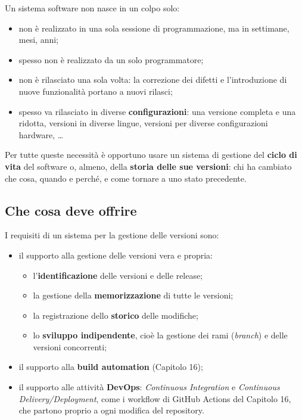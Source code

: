 Un sistema software non nasce in un colpo solo:

\begin{itemize}
  \item non è realizzato in una sola sessione di programmazione, ma in settimane, mesi, anni;
  \item spesso non è realizzato da un solo programmatore;
  \item non è rilasciato una sola volta: la correzione dei difetti e l'introduzione di nuove funzionalità portano a
        nuovi rilasci;
  \item spesso va rilasciato in diverse \textbf{configurazioni}: una versione completa e una ridotta, versioni in
        diverse lingue, versioni per diverse configurazioni hardware, \ldots
\end{itemize}

Per tutte queste necessità è opportuno usare un sistema di gestione del \textbf{ciclo di vita} del software o, almeno,
della \textbf{storia delle sue versioni}: chi ha cambiato che cosa, quando e perché, e come tornare a uno stato
precedente.

\subsection{Che cosa deve offrire}

I requisiti di un sistema per la gestione delle versioni sono:

\begin{itemize}
  \item il supporto alla gestione delle versioni vera e propria:
        \begin{itemize}
          \item l'\textbf{identificazione} delle versioni e delle release;
          \item la gestione della \textbf{memorizzazione} di tutte le versioni;
          \item la registrazione dello \textbf{storico} delle modifiche;
          \item lo \textbf{sviluppo indipendente}, cioè la gestione dei rami (\textit{branch}) e delle versioni
                concorrenti;
        \end{itemize}
  \item il supporto alla \textbf{build automation} (Capitolo 16);
  \item il supporto alle attività \textbf{DevOps}: \textit{Continuous Integration} e \textit{Continuous
        Delivery/Deployment}, come i workflow di GitHub Actions del Capitolo 16, che partono proprio a ogni
        modifica del repository.
\end{itemize}

